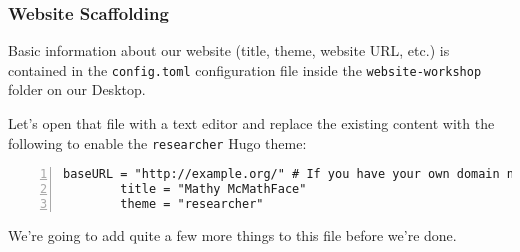 \begin{frame}[fragile]
    \frametitle{Website Scaffolding}

    Basic information about our website (title, theme, website URL, etc.) is contained in the \texttt{config.toml} 
    configuration file inside the \texttt{website-workshop} folder on our Desktop. 
    
    \medskip

    Let's open that file with a text editor and replace the existing content with the following to enable the
    \texttt{researcher} Hugo theme:

    \bigskip

    \begin{lstlisting}[style=saneCode,gobble=8,title={config.toml},numbers=left]
        baseURL = "http://example.org/" # If you have your own domain name, add it here.
        title = "Mathy McMathFace"
        theme = "researcher"
    \end{lstlisting}

    \vfill

    We're going to add quite a few more things to this file before we're done.
\end{frame}